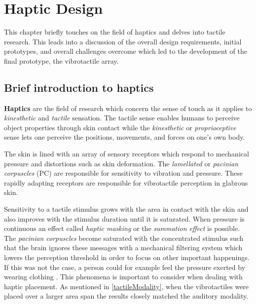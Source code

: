 \chapter{Haptic Design}
This chapter briefly touches on the field of haptics and delves into tactile research. This leads into a discussion of the overall design requirements, initial prototypes, and overall challenges overcome which led to the development of the final prototype, the vibrotactile array.

\section{Brief introduction to haptics}
\textbf{Haptics} are the field of research which concern the sense of touch as it applies to \textit{kinesthetic} and \textit{tactile} sensation. The tactile sense enables humans to perceive object properties through skin contact while the \textit{kinesthetic} or \textit{proprioceptive} sense lets one perceive the positions, movements, and forces on one's own body. 

The skin is lined with an array of sensory receptors which respond to mechanical pressure and distortions such as skin deformation. The \textit{lamellated} or \textit{pacinian corpuscles} (PC) are responsible for sensitivity to vibration and pressure. These rapidly adapting receptors are responsible for vibrotactile perception in glabrous skin. 

Sensitivity to a tactile stimulus grows with the area in contact with the skin and also improves with the stimulus duration until it is saturated. When pressure is continuous an effect called \textit{haptic masking} or the \textit{summation effect} is possible. The \textit{pacinian corpuscles} become saturated with the concentrated stimulus such that the brain ignores these messages with a mechanical filtering system which lowers the perception threshold in order to focus on other important happenings. If this was not the case, a person could for example feel the pressure exerted by wearing clothing \cite{choi2013vibrotactile}. This phenomena is important to consider when dealing with haptic placement. As mentioned in \ref{tactileModality}, when the vibrotactiles were placed over a larger area span the results closely matched the auditory modality.

